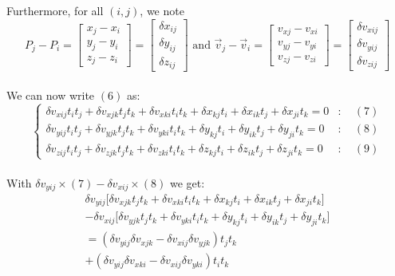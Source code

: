 \documentclass[12pt]{article}
\begin{document}
Furthermore, for all $(i, j)$, we note
$$
P_j - P_i =
\left[ \begin{array}{l}
x_j - x_i \\
y_j - y_i \\
z_j - z_i
\end{array} \right] =
\left[ \begin{array}{l}
\delta x_{ij} \\
\delta y_{ij} \\
\delta z_{ij}
\end{array} \right]
\text{ and }
\vec{v}_j - \vec{v}_i =
\left[ \begin{array}{l}
v_{xj} - v_{xi} \\
v_{yj} - v_{yi} \\
v_{zj} - v_{zi}
\end{array} \right] =
\left[ \begin{array}{l}
\delta v_{xij} \\
\delta v_{yij} \\
\delta v_{zij}
\end{array} \right]
$$ \\

We can now write $(6)$ as:
$$
\left\{ \begin{array}{lr}
\delta v_{xij}t_i t_j + \delta v_{xjk}t_j t_k + \delta v_{xki}t_i t_k + \delta x_{kj}t_i + \delta x_{ik}t_j + \delta x_{ji}t_k = 0 & : \quad (7) \\
\delta v_{yij}t_i t_j + \delta v_{yjk}t_j t_k + \delta v_{yki}t_i t_k + \delta y_{kj}t_i + \delta y_{ik}t_j + \delta y_{ji}t_k = 0 & : \quad (8) \\
\delta v_{zij}t_i t_j + \delta v_{zjk}t_j t_k + \delta v_{zki}t_i t_k + \delta z_{kj}t_i + \delta z_{ik}t_j + \delta z_{ji}t_k = 0 & : \quad (9)
\end{array} \right.
$$ \\

With $\delta v_{yij} \times (7) - \delta v_{xij} \times (8)$ we get:
$$
\begin{array}{l}
  \delta v_{yij}\big[\delta v_{xjk}t_j t_k + \delta v_{xki}t_i t_k + \delta x_{kj}t_i + \delta x_{ik}t_j + \delta x_{ji}t_k\big] \\
- \delta v_{xij}\big[\delta v_{yjk}t_j t_k + \delta v_{yki}t_i t_k + \delta y_{kj}t_i + \delta y_{ik}t_j + \delta y_{ji}t_k\big] \\
= (\delta v_{yij}\delta v_{xjk} - \delta v_{xij}\delta v_{yjk})t_j t_k\\
+ (\delta v_{yij}\delta v_{xki} - \delta v_{xij}\delta v_{yki})t_i t_k
\end{array}
$$ \\
\end{document}
